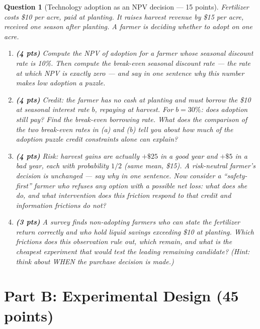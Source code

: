 \documentclass[11pt]{article}
\newtheorem{question}{Question}
\begin{document}
\begin{question}[Technology adoption as an NPV decision --- 15 points]
Fertilizer costs \$10 per acre, paid at planting. It raises harvest
revenue by \$15 per acre, received one season after planting. A farmer is
deciding whether to adopt on one acre.

\begin{enumerate}[label=(\alph*)]
  \item \textbf{(4 pts)} Compute the NPV of adoption for a farmer whose
        seasonal discount rate is 10\%. Then compute the break-even
        seasonal discount rate --- the rate at which NPV is exactly zero
        --- and say in one sentence why this number makes low adoption a
        puzzle.
  \item \textbf{(4 pts)} Credit: the farmer has no cash at planting and
        must borrow the \$10 at seasonal interest rate $b$, repaying at
        harvest. For $b = 30\%$: does adoption still pay? Find the
        break-even borrowing rate. What does the comparison of the two
        break-even rates in (a) and (b) tell you about how much of the
        adoption puzzle credit constraints alone can explain?
  \item \textbf{(4 pts)} Risk: harvest gains are actually $+\$25$ in a
        good year and $+\$5$ in a bad year, each with probability
        $1/2$ (same mean, \$15). A risk-neutral farmer's decision is
        unchanged --- say why in one sentence. Now consider a
        ``safety-first'' farmer who refuses any option with a possible
        net loss: what does she do, and what intervention does this
        friction respond to that credit and information frictions do not?
  \item \textbf{(3 pts)} A survey finds non-adopting farmers who can
        state the fertilizer return correctly and who hold \emph{liquid}
        savings exceeding \$10 at planting. Which frictions does this observation
        rule out, which remain, and what is the cheapest experiment that
        would test the leading remaining candidate? \emph{(Hint: think
        about WHEN the purchase decision is made.)}
\end{enumerate}
\end{question}

\section*{Part B: Experimental Design (45 points)}
\end{document}

